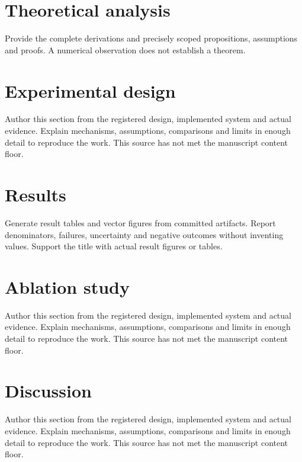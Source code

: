 \documentclass[11pt]{article}
\begin{document}
\section{Theoretical analysis}\label{sec:theoretical-analysis}
Provide the complete derivations and precisely scoped propositions, assumptions and proofs. A numerical observation does not establish a theorem.

\section{Experimental design}\label{sec:experimental-design}
Author this section from the registered design, implemented system and actual evidence. Explain mechanisms, assumptions, comparisons and limits in enough detail to reproduce the work. This source has not met the manuscript content floor.

\section{Results}\label{sec:results}
Generate result tables and vector figures from committed artifacts. Report denominators, failures, uncertainty and negative outcomes without inventing values. Support the title with actual result figures or tables.

\section{Ablation study}\label{sec:ablation-study}
Author this section from the registered design, implemented system and actual evidence. Explain mechanisms, assumptions, comparisons and limits in enough detail to reproduce the work. This source has not met the manuscript content floor.

\section{Discussion}\label{sec:discussion}
Author this section from the registered design, implemented system and actual evidence. Explain mechanisms, assumptions, comparisons and limits in enough detail to reproduce the work. This source has not met the manuscript content floor.
\end{document}

